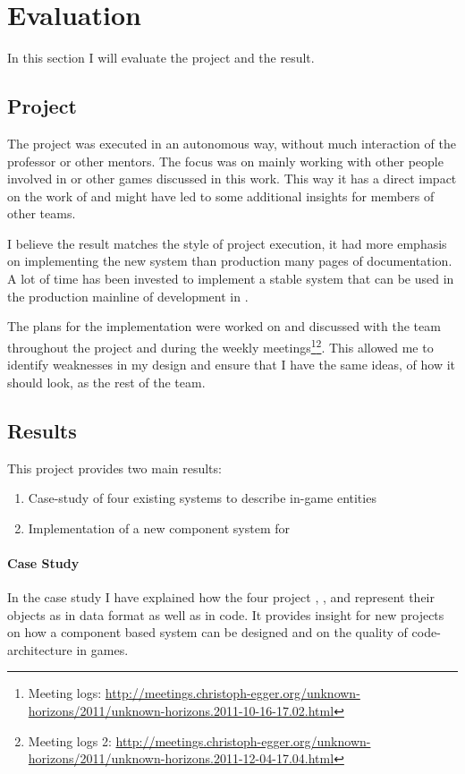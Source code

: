 \section{Evaluation}
In this section I will evaluate the project and the result.

\subsection{Project}
The project was executed in an autonomous way, without much interaction of the professor or other mentors. The focus was
on mainly working with other people involved in \UH{} or other \OS{} games discussed in this work. This way it has a
direct impact on the work of \UH{} and might have led to some additional insights for members of other teams.

I believe the result matches the style of project execution, it had more emphasis on implementing the new
system than production many pages of documentation. A lot of time has been invested to implement a stable system that
can be used in the production mainline of development in \UH{}.

The plans for the implementation were worked on and discussed with the \UH{} team throughout the project and during the
weekly meetings\footnote{Meeting logs:
\url{http://meetings.christoph-egger.org/unknown-horizons/2011/unknown-horizons.2011-10-16-17.02.html}}\footnote{Meeting
logs 2: \url{http://meetings.christoph-egger.org/unknown-horizons/2011/unknown-horizons.2011-12-04-17.04.html}}. This
allowed me to identify weaknesses in my design and ensure that I have the same ideas, of how it should look, as the rest
of the team.

\subsection{Results}
This project provides two main results:
\begin{enumerate}
    \item Case-study of four existing systems to describe in-game entities
    \item Implementation of a new component system for \UH
\end{enumerate}

\paragraph{Case Study}
In the case study I have explained how the four project \UH{}, \BOW{}, \GLEST{} and \AD{} represent their objects as
in data format as well as in code. It provides insight for new projects on how a component based system can be designed
and on the quality of code-architecture in \OS{} games.


